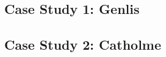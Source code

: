 \documentclass[10pt,fleqn]{article}
\numberwithin{equation}{section}
\begin{document}
\begin{appendix}
\subsection{Case Study 1: Genlis}
\label{app:CS1}
%

\subsection{Case Study 2: Catholme}
\label{app:CS2}
%

%

\end{appendix}

\newpage
\printbibliography
\end{document}
